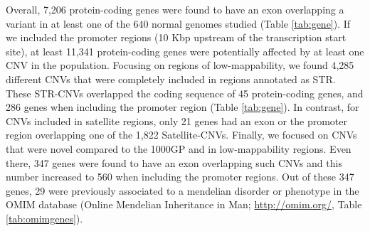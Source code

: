Overall, 7,206 protein-coding genes were found to have an exon overlapping a variant in at least one of the 640 normal genomes studied (Table \ref{tab:gene}).
If we included the promoter regions (10 Kbp upstream of the transcription start site), at least 11,341 protein-coding genes were potentially affected by at least one CNV in the population.
Focusing on regions of low-mappability, we found 4,285 different CNVs that were completely included in regions annotated as STR.
These STR-CNVs overlapped the coding sequence of 45 protein-coding genes, and 286 genes when including the promoter region (Table \ref{tab:gene}).
In contrast, for CNVs included in satellite regions, only 21 genes had an exon or the promoter region overlapping one of the 1,822 Satellite-CNVs.
Finally, we focused on CNVs that were novel compared to the 1000GP\cite{Sudmant2015a} and in low-mappability regions.
Even there, 347 genes were found to have an exon overlapping such CNVs and this number increased to 560 when including the promoter regions.
Out of these 347 genes, 29 were previously associated to a mendelian disorder or phenotype in the OMIM database (Online Mendelian Inheritance in Man; \url{http://omim.org/}, Table \ref{tab:omimgenes}).

